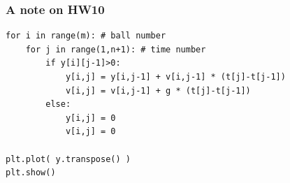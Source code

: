 \documentclass[11pt]{beamer}
\begin{document}
\begin{frame}[fragile]
  \frametitle{A note on HW10}

  \begin{Verbatim}
for i in range(m): # ball number
    for j in range(1,n+1): # time number
        if y[i][j-1]>0:
            y[i,j] = y[i,j-1] + v[i,j-1] * (t[j]-t[j-1])
            v[i,j] = v[i,j-1] + g * (t[j]-t[j-1])
        else:
            y[i,j] = 0
            v[i,j] = 0

plt.plot( y.transpose() )
plt.show()
  \end{Verbatim}
\end{frame}
\end{document}
